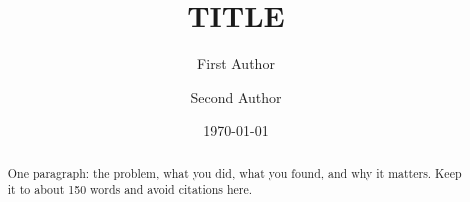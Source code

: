\documentclass[11pt]{article}
\title{\bfseries {{TITLE}}}
\author[1]{First Author}
\author[2]{Second Author}
\affil[1]{University One}
\affil[2]{University Two}
\date{\today}
\begin{document}
\maketitle

\begin{abstract}
One paragraph: the problem, what you did, what you found, and why it matters. Keep it to about 150 words and avoid citations here.
\end{abstract}






\end{document}
